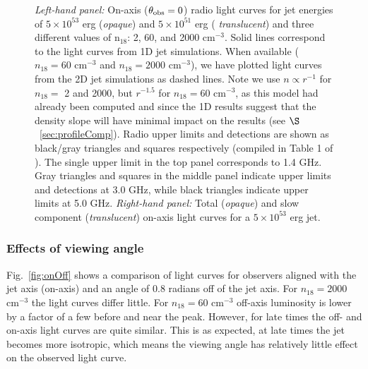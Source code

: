 \documentclass[usenatbib,fleqn]{mnras}
\begin{document}
\begin{figure}
  \caption{\label{fig:lightcurves} \textit{Left-hand panel:} On-axis
    ($\theta_{\rm obs}=0$) radio light curves for jet energies of
    $5\times 10^{53}$ erg ({\it opaque}) and $5\times 10^{51}$ erg ({\it
      translucent}) and three different values of n$_{18}$: 2, 60, and
    2000 cm$^{-3}$.  Solid lines correspond to the light curves from
    1D jet simulations. When available ($n_{18}=60$ cm$^{-3}$ and
    $n_{18}=2000$ cm$^{-3}$), we have plotted light curves from the 2D
    jet simulations as dashed lines. Note we use $n\propto r^{-1}$ for
    $n_{18}=$ 2 and 2000, but $r^{-1.5}$ for $n_{18}=60$ cm$^{-3}$, as
    this model had already been computed and since the 1D results
    suggest that the density slope will have minimal impact on the
    results (see $\S$~\ref{sec:profileComp}).  Radio upper limits and
    detections are shown as black/gray triangles and squares
    respectively (compiled in Table 1 of \citealt{Mimica+2015}). The
    single upper limit in the top panel corresponds to 1.4 GHz. Gray
    triangles and squares in the middle panel indicate upper limits
    and detections at 3.0 GHz, while black triangles indicate upper
    limits at 5.0 GHz. \textit{Right-hand panel:} Total ({\it opaque})
    and slow component ({\it translucent}) on-axis light curves for a
    $5\times 10^{53}$ erg jet.}
\end{figure}


 \subsubsection{Effects of viewing angle}
 Fig.~\ref{fig:onOff} shows a comparison of light curves for observers
 aligned with the jet axis (on-axis) and an angle of 0.8 radians off
 of the jet axis.  For $n_{18}=2000$ cm$^{-3}$ the light curves differ
 little.  For $n_{18}=60$ cm$^{-3}$ off-axis luminosity is lower by a
 factor of a few before and near the peak. However, for late times the
 off- and on-axis light curves are quite similar. This is as expected,
 at late times the jet becomes more isotropic, which means the viewing
 angle has relatively little effect on the observed light curve.
\end{document}
